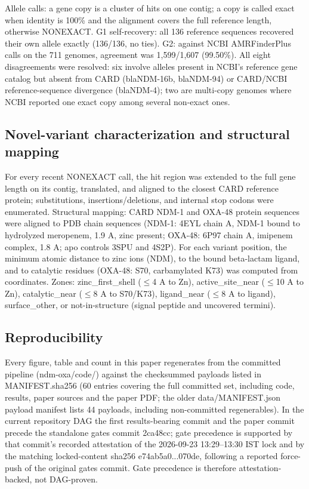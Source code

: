 \documentclass[11pt]{article}
\begin{document}
Allele calls: a gene copy is a cluster of hits on one contig; a copy is called exact when identity is 100\% and the alignment covers the full reference length, otherwise NONEXACT. G1 self-recovery: all 136 reference sequences recovered their own allele exactly (136/136, no ties). G2: against NCBI AMRFinderPlus calls on the 711 genomes, agreement was 1,599/1,607 (99.50\%). All eight disagreements were resolved: six involve alleles present in NCBI's reference gene catalog but absent from CARD (blaNDM-16b, blaNDM-94) or CARD/NCBI reference-sequence divergence (blaNDM-4); two are multi-copy genomes where NCBI reported one exact copy among several non-exact ones.

\subsection{Novel-variant characterization and structural mapping}
For every recent NONEXACT call, the hit region was extended to the full gene length on its contig, translated, and aligned to the closest CARD reference protein; substitutions, insertions/deletions, and internal stop codons were enumerated. Structural mapping: CARD NDM-1 and OXA-48 protein sequences were aligned to PDB chain sequences (NDM-1: 4EYL chain A, NDM-1 bound to hydrolyzed meropenem, 1.9 A, zinc present; OXA-48: 6P97 chain A, imipenem complex, 1.8 A; apo controls 3SPU and 4S2P). For each variant position, the minimum atomic distance to zinc ions (NDM), to the bound beta-lactam ligand, and to catalytic residues (OXA-48: S70, carbamylated K73) was computed from coordinates. Zones: zinc\_first\_shell ($\leq$4 A to Zn), active\_site\_near ($\leq$10 A to Zn), catalytic\_near ($\leq$8 A to S70/K73), ligand\_near ($\leq$8 A to ligand), surface\_other, or not-in-structure (signal peptide and uncovered termini).

\subsection{Reproducibility}
Every figure, table and count in this paper regenerates from the committed pipeline (ndm-oxa/code/) against the checksummed payloads listed in MANIFEST.sha256 (60 entries covering the full committed set, including code, results, paper sources and the paper PDF; the older data/MANIFEST.json payload manifest lists 44 payloads, including non-committed regenerables). In the current repository DAG the first results-bearing commit and the paper commit precede the standalone gates commit 2ca48cc; gate precedence is supported by that commit's recorded attestation of the 2026-09-23 13:29--13:30 IST lock and by the matching locked-content sha256 e74ab5a0...070de, following a reported force-push of the original gates commit. Gate precedence is therefore attestation-backed, not DAG-proven.
\end{document}
